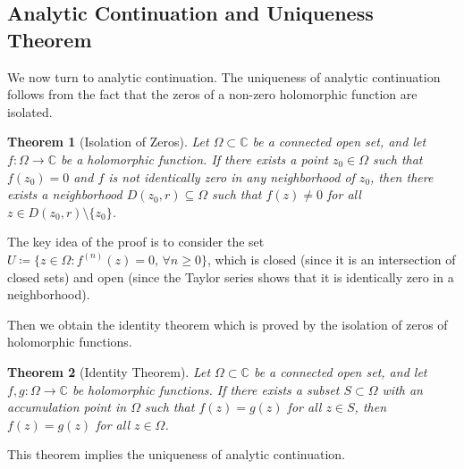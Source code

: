\documentclass{article}
\newtheorem{theorem}{Theorem}[section]
\theoremstyle{definition}
\newcommand{\C}{\mathbb{C}}
\renewcommand{\geq}{\geqslant}
\begin{document}
\subsection{Analytic Continuation and Uniqueness Theorem}
We now turn to analytic continuation. The uniqueness of analytic continuation follows from the fact that the zeros of a non-zero holomorphic function are isolated.
\begin{theorem}[Isolation of Zeros]
Let \(\Omega\subset\C\) be a connected open set, and let \(f\colon\Omega\to\C\) be a holomorphic function. If there exists a point \(z_0\in\Omega\) such that \(f(z_0)=0\) and \(f\) is not identically zero in any neighborhood of \(z_0\), then there exists a neighborhood \(D(z_0,r)\subseteq \Omega\) such that \(f(z)\neq 0\) for all \(z\in D(z_0,r)\setminus\{z_0\}\).
\end{theorem}
The key idea of the proof is to consider the set $U\coloneq \{ z\in \Omega\colon f^{(n)}(z)=0,\,\forall n\geq 0\}$, which is closed (since it is an intersection of closed sets) and open (since the Taylor series shows that it is identically zero in a neighborhood). 

Then we obtain the identity theorem which is proved by the isolation of zeros of holomorphic functions.
\begin{theorem}[Identity Theorem]
Let \(\Omega\subset\C\) be a connected open set, and let \(f,g\colon\Omega\to\C\) be holomorphic functions. If there exists a subset \(S\subset\Omega\) with an accumulation point in \(\Omega\) such that \(f(z)=g(z)\) for all \(z\in S\), then \(f(z)=g(z)\) for all \(z\in\Omega\).
\end{theorem}
    This theorem implies the uniqueness of analytic continuation.
\end{document}
